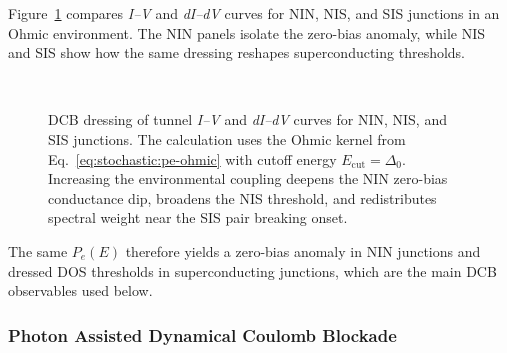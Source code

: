        Figure~\ref{fig:stochastic:dcb} compares \textit{I--V} and \textit{dI--dV} curves for NIN, NIS, and SIS junctions in an Ohmic environment. The NIN panels isolate the zero-bias anomaly, while NIS and SIS show how the same dressing reshapes superconducting thresholds.

        \begin{figure}[t]
            \centering
            \hfill
            \hfill
            \\
            \hfill
            \hfill
            \caption{
                DCB dressing of tunnel \textit{I--V} and \textit{dI--dV} curves for NIN, NIS, and SIS junctions.
                The calculation uses the Ohmic kernel from Eq.~\eqref{eq:stochastic:pe-ohmic} with cutoff energy $E_\mathrm{cut}=\Delta_0$.
                Increasing the environmental coupling deepens the NIN zero-bias conductance dip, broadens the NIS threshold, and redistributes spectral weight near the SIS pair breaking onset.
                }
            \label{fig:stochastic:dcb}
        \end{figure}

        The same $P_e(E)$ therefore yields a zero-bias anomaly in NIN junctions and dressed DOS thresholds in superconducting junctions, which are the main DCB observables used below.

        \subsubsection*{Photon Assisted Dynamical Coulomb Blockade}

